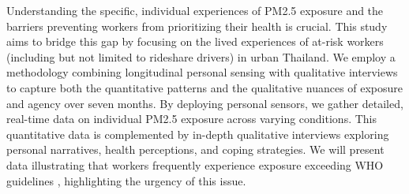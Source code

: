 


Understanding the specific, individual experiences of PM2.5 exposure and the barriers preventing workers from prioritizing their health is crucial.
This study aims to bridge this gap by focusing on the lived experiences of at-risk workers (including but not limited to rideshare drivers) in urban Thailand.
We employ a methodology combining longitudinal personal sensing with qualitative interviews to capture both the quantitative patterns and the qualitative nuances of exposure and agency over seven months.
By deploying personal sensors, we gather detailed, real-time data on individual PM2.5 exposure across varying conditions.
This quantitative data is complemented by in-depth qualitative interviews exploring personal narratives, health perceptions, and coping strategies.
We will present data illustrating that workers frequently experience exposure exceeding WHO guidelines \cite{who_aqg_2021}, highlighting the urgency of this issue.

